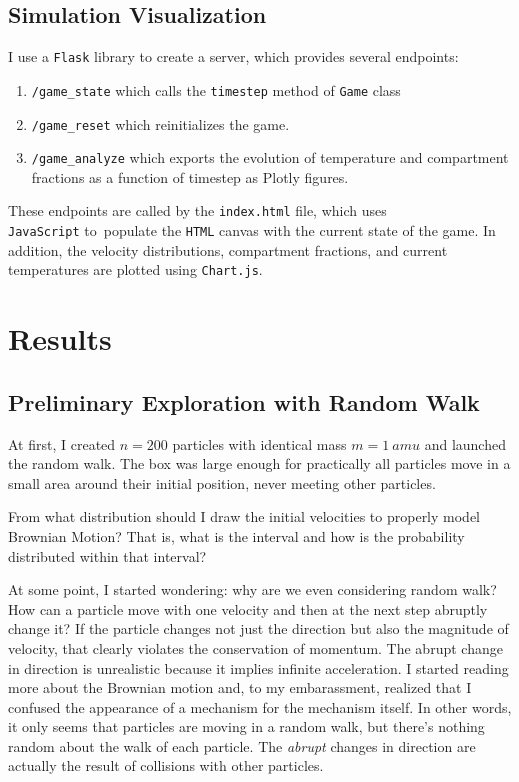 \documentclass[10pt]{article}
\begin{document}
\subsection{Simulation Visualization}

I use a \texttt{Flask} library to create a server, which provides several endpoints:
\begin{enumerate}
    \item \texttt{/game\_state} which calls the \texttt{timestep} method of \texttt{Game} class
    \item \texttt{/game\_reset} which reinitializes the game.
    \item \texttt{/game\_analyze} which exports the evolution of temperature and compartment fractions as a function of timestep as Plotly figures.
\end{enumerate}

These endpoints are called by the \texttt{index.html} file, which uses \\\texttt{JavaScript} to~populate the \texttt{HTML} canvas with the current state of the game. In addition, the velocity distributions, compartment fractions, and current temperatures are plotted using \texttt{Chart.js}.
    

\section{Results}
\subsection{Preliminary Exploration with Random Walk}
At first, I created $n=200$ particles with identical mass $m=\qty{1}{amu}$ and launched the random walk. The box was large enough for practically all particles move in a small area around their initial position, never meeting other particles.

\begin{explorationbox}
    From what distribution should I draw the initial velocities to properly model Brownian Motion? That is, what is the interval and how is the probability distributed within that interval? 
\end{explorationbox}

At some point, I started wondering: why are we even considering random walk? How can a particle move with one velocity and then at the next step abruptly change it? If the particle changes not just the direction but also the magnitude of velocity, that clearly violates the conservation of momentum. The abrupt change in direction is unrealistic because it implies infinite acceleration. I started reading more about the Brownian motion and, to my embarassment, realized that I confused the appearance of a mechanism for the mechanism itself. In other words, it only seems that particles are moving in a random walk, but there's nothing random about the walk of each particle. The \textit{abrupt} changes in direction are actually the result of collisions with other particles.
\end{document}
